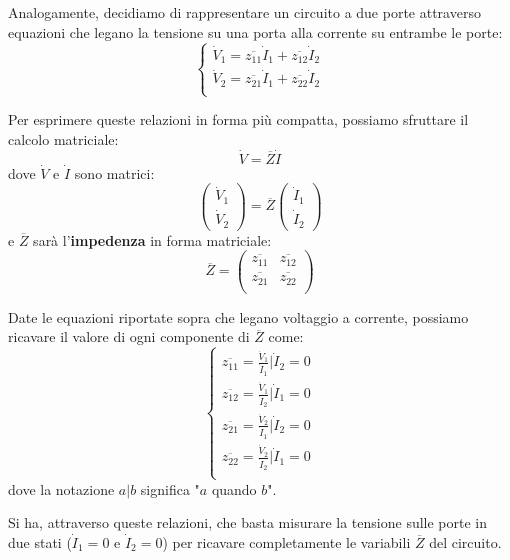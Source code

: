 \documentclass[a4paper,11pt]{article}
\begin{document}
Analogamente, decidiamo di rappresentare un circuito a due porte attraverso equazioni che legano la tensione su una porta alla corrente su entrambe le porte:
\[
	\begin{cases}
		\dot{V}_1 = \overline{z_{11}} \dot{I}_1 + \overline{z_{12}} \dot{I}_2 \\ 	
		\dot{V}_2 = \overline{z_{21}} \dot{I}_1 + \overline{z_{22}} \dot{I}_2 \\ 	
	\end{cases}
\]

Per esprimere queste relazioni in forma più compatta, possiamo sfruttare il calcolo matriciale:
$$
\dot{V} = \overline{Z} \dot{I}
$$
dove $\dot{V}$ e $\dot{I}$ sono matrici:
$$
\begin{pmatrix}
	\dot{V}_1 \\ \dot{V}_2
\end{pmatrix}
= \overline{Z}
\begin{pmatrix}
	\dot{I}_1 \\ \dot{I}_2
\end{pmatrix}
$$
e $\overline{Z}$ sarà l'\textbf{impedenza} in forma matriciale:
$$
\overline{Z} =
\begin{pmatrix}
	\overline{z_{11}} & \overline{z_{12}} \\ 
	\overline{z_{21}} & \overline{z_{22}} \\ 
\end{pmatrix}
$$

Date le equazioni riportate sopra che legano voltaggio a corrente, possiamo ricavare il valore di ogni componente di $\overline{Z}$ come:
\[
	\begin{cases}
		\overline{z_{11}} = \frac{\dot{V}_1}{\dot{I}_1} \Big| \dot{I}_2 = 0 \\
		\overline{z_{12}} = \frac{\dot{V}_1}{\dot{I}_2} \Big| \dot{I}_1 = 0 \\
		\overline{z_{21}} = \frac{\dot{V}_2}{\dot{I}_1} \Big| \dot{I}_2 = 0 \\
		\overline{z_{22}} = \frac{\dot{V}_2}{\dot{I}_2} \Big| \dot{I}_1 = 0 \\
	\end{cases}
\]
dove la notazione $a \Big| b$ significa "$a$ quando $b$".

Si ha, attraverso queste relazioni, che basta misurare la tensione sulle porte in due stati ($\dot{I}_1 = 0$ e $\dot{I}_2 = 0$) per ricavare completamente le variabili $\overline{Z}$ del circuito.
\end{document}
